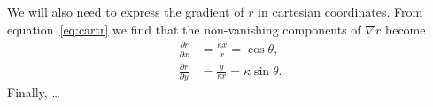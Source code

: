 \documentclass{notes}
\begin{document}
    We will also need to express the gradient of $r$ in cartesian coordinates.
    From equation~\eqref{eq:cartr} we find that the non-vanishing components of
    $\nabla r$ become
    \begin{equation}
        \begin{aligned}
            \frac{\partial r}{\partial x} &= \frac{\kappa x}{r} = \cos\theta,\\
            \frac{\partial r}{\partial y} &= \frac{y}{\kappa r} = \kappa\sin\theta.
        \end{aligned}
    \end{equation}
    Finally, \ldots
\end{document}
